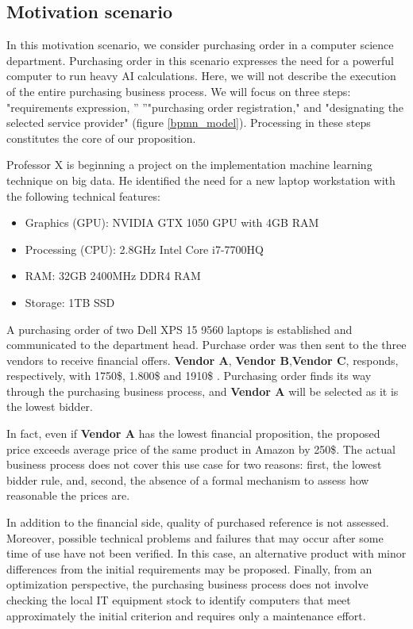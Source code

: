 \documentclass[preprint,3p,onecolumn]{elsarticle}
\begin{document}
\subsection{Motivation scenario}
\par In this motivation scenario, we consider purchasing order in a computer science department. Purchasing order in this scenario expresses the  need for a powerful computer to run heavy AI calculations. Here, we will not describe the execution of the entire purchasing business process. We will focus on three steps: "requirements expression, ” ”"purchasing order registration," and "designating the selected service provider" (figure \ref{bpmn_model}). Processing in these steps constitutes the core of our proposition.
\par Professor X is beginning a project on the implementation machine learning technique on big data. He identified the need for a new laptop workstation with the following technical features:
\begin{itemize}
\item Graphics (GPU): NVIDIA GTX 1050 GPU with 4GB RAM
\item Processing (CPU): 2.8GHz Intel Core i7-7700HQ
\item RAM: 32GB 2400MHz DDR4 RAM 
\item Storage: 1TB SSD
\end{itemize}

\par A purchasing order of two Dell XPS 15 9560 laptops is established and communicated to the department head. Purchase order was then sent to the three vendors to receive financial offers. \textbf{Vendor A}, \textbf{Vendor B},\textbf{Vendor C}, responds, respectively, with 1750\$, 1.800\$ and 1910\$ . Purchasing order finds its way through the purchasing business process, and \textbf{Vendor A} will be selected as it is the lowest bidder.


\par In fact, even if \textbf{Vendor A} has the lowest financial proposition, the proposed price exceeds average price of the same product in Amazon by 250\$. The actual business process does not cover this use case for two reasons: first, the lowest bidder rule, and, second, the absence of a formal mechanism to assess how reasonable the prices are. 

\par In addition to the financial side, quality of purchased reference is not assessed. Moreover, possible technical problems and failures that may occur after some time of use have not been verified. In this case, an alternative product with minor differences from the initial requirements may be proposed. Finally, from an optimization perspective, the purchasing business process does not involve checking the local IT equipment stock to identify computers that meet approximately the initial criterion and requires only a maintenance effort.
\end{document}
